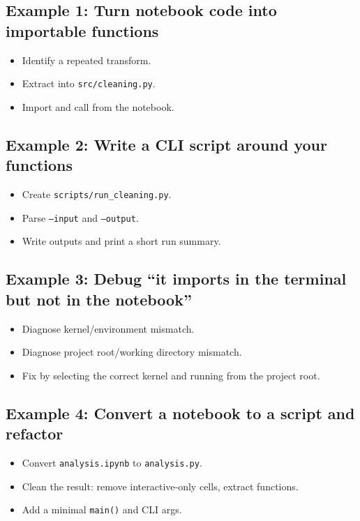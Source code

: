 \subsection{Example 1: Turn notebook code into importable functions}
\begin{itemize}
\item Identify a repeated transform.
\item Extract into \texttt{src/cleaning.py}.
\item Import and call from the notebook.
\end{itemize}

\subsection{Example 2: Write a CLI script around your functions}
\begin{itemize}
\item Create \texttt{scripts/run\_cleaning.py}.
\item Parse \texttt{--input} and \texttt{--output}.
\item Write outputs and print a short run summary.
\end{itemize}

\subsection{Example 3: Debug ``it imports in the terminal but not in the notebook''}
\begin{itemize}
\item Diagnose kernel/environment mismatch.
\item Diagnose project root/working directory mismatch.
\item Fix by selecting the correct kernel and running from the project root.
\end{itemize}

\subsection{Example 4: Convert a notebook to a script and refactor}
\begin{itemize}
\item Convert \texttt{analysis.ipynb} to \texttt{analysis.py}.
\item Clean the result: remove interactive-only cells, extract functions.
\item Add a minimal \texttt{main()} and CLI args.
\end{itemize}

